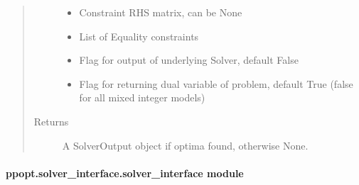 \documentclass[letterpaper,10pt,english]{sphinxmanual}
\begin{document}
\begin{fulllineitems}
\begin{quote}
\begin{description}
\begin{itemize}
\item {} 
\sphinxAtStartPar
{} \textendash{} Constraint RHS matrix, can be None

\item {} 
\sphinxAtStartPar
{} \textendash{} List of Equality constraints

\item {} 
\sphinxAtStartPar
{} \textendash{} Flag for output of underlying Solver, default False

\item {} 
\sphinxAtStartPar
{} \textendash{} Flag for returning dual variable of problem, default True (false for all mixed integer models)

\end{itemize}

\item[{Returns}] \leavevmode
\sphinxAtStartPar
A SolverOutput object if optima found, otherwise None.

\end{description}\end{quote}

\end{fulllineitems}



\paragraph{ppopt.solver\_interface.solver\_interface module}
\label{\detokenize{ppopt.solver_interface:module-ppopt.solver_interface.solver_interface}}\label{\detokenize{ppopt.solver_interface:ppopt-solver-interface-solver-interface-module}}
\end{document}
